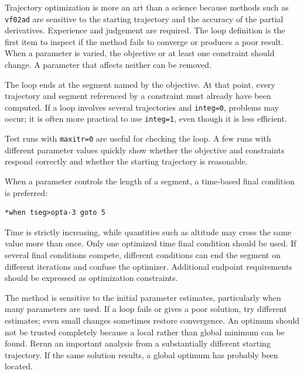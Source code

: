 
Trajectory optimization is more an art than a science because methods such as
\texttt{vf02ad} are sensitive to the starting trajectory and the accuracy of the partial
derivatives.  Experience and judgement are required.  The loop definition is the
first item to inspect if the method fails to converge or produces a poor result.  When
a parameter is varied, the objective or at least one constraint should change.  A
parameter that affects neither can be removed.

The loop ends at the segment named by the objective.  At that point, every trajectory
and segment referenced by a constraint must already have been computed.  If a loop
involves several trajectories and \texttt{integ=0}, problems may occur; it is often
more practical to use \texttt{integ=1}, even though it is less efficient.

Test runs with \texttt{maxitr=0} are useful for checking the loop.  A few runs with
different parameter values quickly show whether the objective and constraints
respond correctly and whether the starting trajectory is reasonable.


When a parameter controls the length of a segment, a time-based final condition is
preferred:

\begin{lstlisting}[style=taosmanual]
*when tseg>opta-3 goto 5
\end{lstlisting}

Time is strictly increasing, while quantities such as altitude may cross the same
value more than once.  Only one optimized time final condition should be used.  If
several final conditions compete, different conditions can end the segment on
different iterations and confuse the optimizer.  Additional endpoint requirements
should be expressed as optimization constraints.


The method is sensitive to the initial parameter estimates, particularly when many
parameters are used.  If a loop fails or gives a poor solution, try different estimates;
even small changes sometimes restore convergence.  An optimum should not be
trusted completely because a local rather than global minimum can be found.  Rerun
an important analysis from a substantially different starting trajectory.  If the same
solution results, a global optimum has probably been located.

